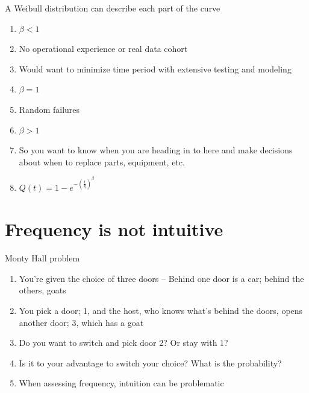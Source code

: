 \documentclass[aspectratio=1610,pdftex,dvipsnames,compress,xcolor={dvipsnames}]{beamer}
\begin{document}
\begin{frame}{A Weibull distribution can describe each part of the curve}
    \begin{enumerate}[series=outerlist,topsep=0pt,itemsep=3pt,leftmargin=*,label=(\arabic*)]
        \item[]$\beta < 1$
        \item[]No operational experience or real data cohort
        \item[]Would want to minimize time period with extensive testing and modeling
            \vspace{0.10in}
        \item[]$\beta = 1$
        \item[]Random failures
            \vspace{0.10in}
        \item[]$\beta > 1$  
        \item[]So you want to know when you are heading in to here and make decisions about when to replace parts, equipment, etc.
            \vspace{0.10in}
        \item[]$Q(t) = 1 - e^{-(\frac{t}{\eta})^{\beta}}$
    \end{enumerate}
\end{frame}


\section{Frequency is not intuitive}


\addtocounter{framenumber}{-1}
\begin{frame}{Monty Hall problem}
    \begin{enumerate}[series=outerlist,topsep=0pt,itemsep=15pt,leftmargin=*,label=(\arabic*)]
        \item[]You're given the choice of three doors -- Behind one door is a car; behind the others, goats
        \item[]You pick a door; 1, and the host, who knows what's behind the doors, opens another door; 3, which has a goat
        \item[]Do you want to switch and pick door 2? Or stay with 1?
        \item[]Is it to your advantage to switch your choice? What is the probability?
        \item[]When assessing frequency, intuition can be problematic
    \end{enumerate}
\end{frame}
\end{document}
